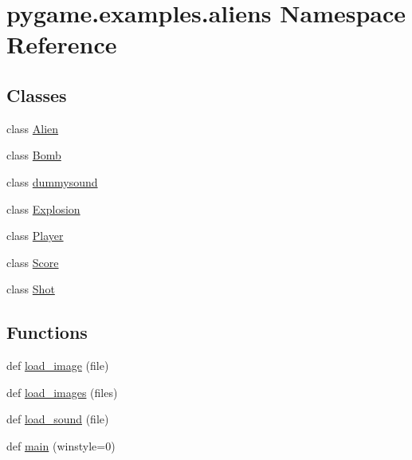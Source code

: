 \hypertarget{namespacepygame_1_1examples_1_1aliens}{}\section{pygame.\+examples.\+aliens Namespace Reference}
\label{namespacepygame_1_1examples_1_1aliens}
\subsection*{Classes}
\begin{DoxyCompactItemize}
\item 
class \hyperlink{classpygame_1_1examples_1_1aliens_1_1_alien}{Alien}
\item 
class \hyperlink{classpygame_1_1examples_1_1aliens_1_1_bomb}{Bomb}
\item 
class \hyperlink{classpygame_1_1examples_1_1aliens_1_1dummysound}{dummysound}
\item 
class \hyperlink{classpygame_1_1examples_1_1aliens_1_1_explosion}{Explosion}
\item 
class \hyperlink{classpygame_1_1examples_1_1aliens_1_1_player}{Player}
\item 
class \hyperlink{classpygame_1_1examples_1_1aliens_1_1_score}{Score}
\item 
class \hyperlink{classpygame_1_1examples_1_1aliens_1_1_shot}{Shot}
\end{DoxyCompactItemize}
\subsection*{Functions}
\begin{DoxyCompactItemize}
\item 
def \hyperlink{namespacepygame_1_1examples_1_1aliens_ac04f30879bdb0f1da7f9a42f37b2de4d}{load\+\_\+image} (file)
\item 
def \hyperlink{namespacepygame_1_1examples_1_1aliens_a89c0484943c46c6b0b1b69f247387754}{load\+\_\+images} (files)
\item 
def \hyperlink{namespacepygame_1_1examples_1_1aliens_a42d90b67120677a70c2cd14d17e81f40}{load\+\_\+sound} (file)
\item 
def \hyperlink{namespacepygame_1_1examples_1_1aliens_ab4c1036e06d6e5e1c93f4415544a3aeb}{main} (winstyle=0)
\end{DoxyCompactItemize}
